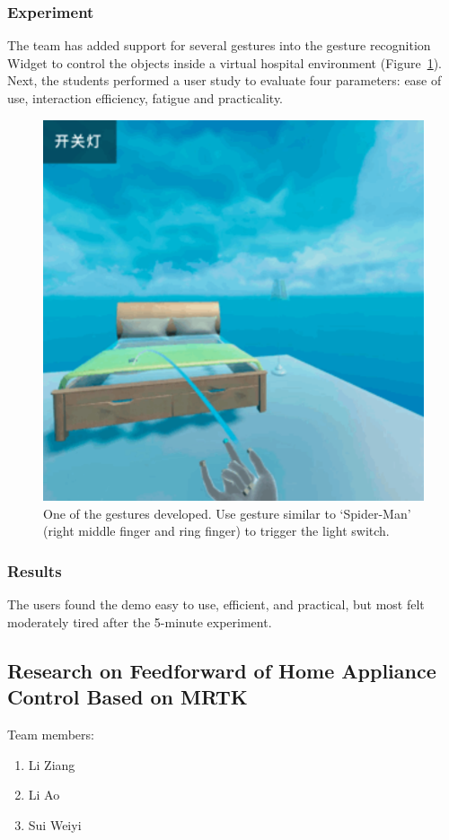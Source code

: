 \subsubsection{Experiment}

The team has added support for several gestures into the gesture recognition Widget to control the objects inside a virtual hospital environment (Figure~\ref{fig:Project4-figure}).
Next, the students performed a user study to evaluate four parameters: ease of use, interaction efficiency, fatigue and practicality. 

\begin{figure}
  \centering
  \includegraphics[width=0.6\linewidth]{figures/Project_4.png}
  \caption{One of the gestures developed. Use gesture similar to ‘Spider-Man’ (right middle finger and ring finger) to trigger the light switch.}
  \label{fig:Project4-figure}
\end{figure}

\subsubsection{Results}
The users found the demo easy to use, efficient, and practical, but most felt moderately tired after the 5-minute experiment.

\subsection{Research on Feedforward of Home Appliance Control Based on MRTK}

Team members:
\begin{enumerate}
    \item Li Ziang
    \item Li Ao
    \item Sui Weiyi
\end{enumerate}

